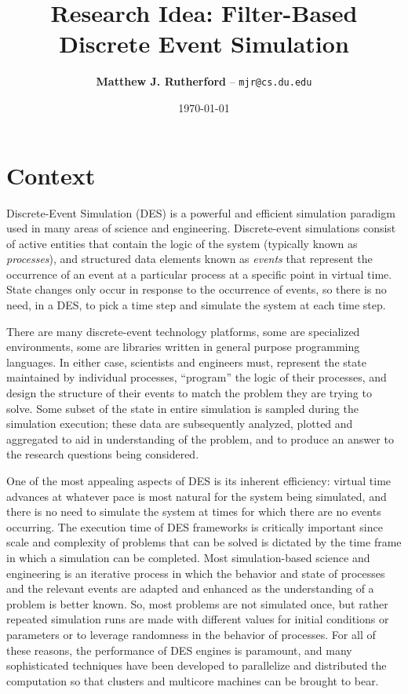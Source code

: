 \documentclass[10pt,notitlepage]{article}
\title{Research Idea: Filter-Based Discrete Event Simulation}
\author{\textbf{Matthew J. Rutherford} -- \texttt{mjr@cs.du.edu}}
\date{\today}
\begin{document}
\lstset{language=Java}
\lstset{basicstyle=\small}
\lstset{frame=single}

\maketitle

\section{Context}

Discrete-Event Simulation (DES) is a powerful and efficient simulation
paradigm used in many areas of science and engineering.
Discrete-event simulations consist of active entities that contain the
logic of the system (typically known as \emph{processes}), and
structured data elements known as \emph{events} that represent the
occurrence of an event at a particular process at a specific point in
virtual time.  State changes only occur in response to the occurrence
of events, so there is no need, in a DES, to pick a time step and
simulate the system at each time step.

There are many discrete-event technology platforms,
some are specialized environments, some are libraries written in
general purpose programming languages.  In either case, scientists and
engineers must, represent the state maintained by individual
processes, ``program'' the logic of their processes, and design the
structure of their events to match the problem they are trying to
solve.  Some subset of the state in entire simulation is sampled
during the simulation execution; these data are subsequently analyzed,
plotted and aggregated to aid in understanding of the problem, and to
produce an answer to the research questions being considered.

One of the most appealing aspects of DES is its inherent efficiency:
virtual time advances at whatever pace is most natural for the system
being simulated, and there is no need to simulate the system at times
for which there are no events occurring.  The execution time of DES
frameworks is critically important since scale and complexity of
problems that can be solved is dictated by the time frame in which a
simulation can be completed.  Most simulation-based science and
engineering is an iterative process in which the behavior and state of
processes and the relevant events are adapted and enhanced as the
understanding of a problem is better known.  So, most problems are not
simulated once, but rather repeated simulation runs are made with
different values for initial conditions or parameters or to leverage
randomness in the behavior of processes.  For all of these reasons,
the performance of DES engines is paramount, and many sophisticated
techniques have been developed to parallelize and distributed the
computation so that clusters and multicore machines can be brought to
bear.
\end{document}
